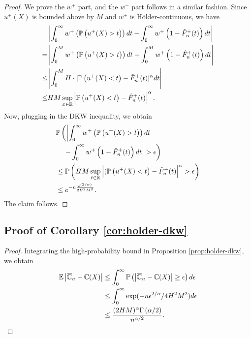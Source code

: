 \begin{proof}
We prove the $w^+$ part, and the $w^-$ part follows in a similar fashion.
Since $u^+(X)$ is bounded above by $M$ and $w^+$ is H\"{o}lder-continuous, we have
\begin{align*}
&\left|\int_0^{\infty} w^+\left(\mathbb{P}\left( u^+(X)>t \right)\right) dt- \int_0^{\infty} w^+\left(1- {\hat F^+_n}(t)\right) dt\right| \\ = &
    \left|\int_0^M w^+\left(\mathbb{P}\left( u^+(X)>t \right)\right) dt- \int_0^M w^+\left(1- {\hat F^+_n}(t)\right) dt\right| \\
\leq& \left|\int_0^M H\cdot |\mathbb{P}\left( u^+(X)<t \right)-{\hat F^+_n}(t)|^\alpha dt\right|\\ \leq& HM\sup_{x\in
\mathbb{R}}\left|\mathbb{P}\left( u^+(X)<t \right)-{\hat F^+_n}(t)\right|^\alpha.
\end{align*}
Now, plugging in the DKW inequality, we obtain
\begin{align}
&\mathbb{P}\left(\left|\intinfinity w^+\left(\Prob{u^+(X)>t}\right) dt \right.\right.\nonumber\\
&\quad\left.\left.- \intinfinity w^+\left(1- {\hat F^+_n}(t)\right) dt\right|>\epsilon\right)
\nonumber\\
& \leq \Prob{HM\sup_{t\in \mathbb{R}} \left|(\Prob{u^+(X)<t}-{\hat F^+_n}(t)\right|^\alpha>\epsilon}\nonumber\\
&
\leq  e^{-n \frac{\epsilon ^{(2/\alpha)}} {2 H^2 M^2}}.\label{eq:dkw3}
\end{align}
The claim follows.
\end{proof}

\subsection*{Proof of Corollary \ref{cor:holder-dkw}}
\begin{proof}
 Integrating the high-probability bound in Proposition \ref{prop:holder-dkw}, we obtain
 \begin{align*}
  \mathbb{E} \left|\overline {\mathbb{C}}_n- \mathbb{C}(X) \right|  
&  \le \int_0^{\infty} \mathbb{P}\left( \left|\overline {\mathbb{C}}_n- \mathbb{C}(X) \right| \geq  \epsilon \right) d\epsilon\\
  &\le \int_0^{\infty} \exp(-n\epsilon^{2/\alpha}/4H^2M^2) d\epsilon\\
  & \le \frac{(2H M)^\alpha \Gamma\left(\alpha/2\right)}{n^{\alpha/2}}.
 \end{align*}
\end{proof}


